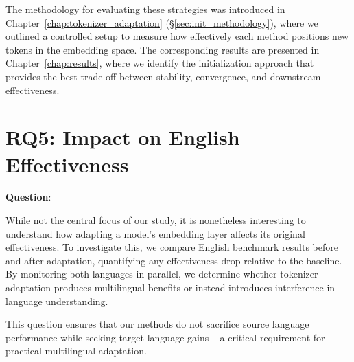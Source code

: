 The methodology for evaluating these strategies was introduced in Chapter~\ref{chap:tokenizer_adaptation} (\S\ref{sec:init_methodology}), where we outlined a controlled setup to measure how effectively each method positions new tokens in the embedding space. The corresponding results are presented in Chapter~\ref{chap:results}, where we identify the initialization approach that provides the best trade-off between stability, convergence, and downstream effectiveness.


\section{RQ5: Impact on English Effectiveness}
\label{sec:english_regression}
\textbf{Question}: \textit{\RQfive}

While not the central focus of our study, it is nonetheless interesting to understand how adapting a model's embedding layer affects its original effectiveness. To investigate this, we compare English benchmark results before and after adaptation, quantifying any effectiveness drop relative to the baseline. By monitoring both languages in parallel, we determine whether tokenizer adaptation produces multilingual benefits or instead introduces interference in language understanding.

This question ensures that our methods do not sacrifice source language performance while seeking target-language gains -- a critical requirement for practical multilingual adaptation.








